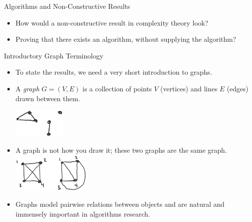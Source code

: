 \begin{frame}{Algorithms and Non-Constructive Results}
   \begin{itemize}
   \item How would a non-constructive result in complexity theory look?
   \pause
   \item Proving that there exists an algorithm, without supplying the algorithm?
   
   \end{itemize}
\end{frame}  


\begin{frame}{Introductory Graph Terminology}
\begin{itemize}
    \item To state the results, we need a very short introduction to graphs.
    \pause
    \item A \emph{graph} $G = (V, E)$ is a collection of points $V$ (vertices) and lines $E$ (edges) drawn between them. 

    \includegraphics[width=0.2\textwidth]{graf2.png}
    \pause
    \item A graph is not how you draw it; these two graphs are the same graph. 
    \includegraphics[width=0.3\textwidth]{graf.png}
    \pause
    \item Graphs model pairwise relations between objects and are natural and immensely important in algorithms research.
\end{itemize}
\pause
\end{frame}

